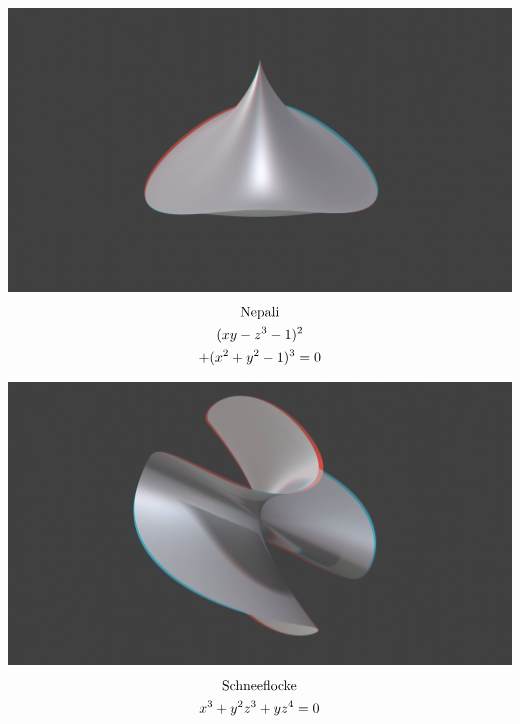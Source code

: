 \documentclass[paperwidth=46in, paperheight = 33.11in]{baposter}%
\begin{document}
\begin{poster}
{    \begin{center}
\begin{minipage}[t]{0.48\linewidth}
    \begin{center}
        \includegraphics[width=1.02\linewidth, scale = 0.5]{pictures/nepali}
        \begin{gather*}
               \textnormal{Nepali}\\
        (xy-z^3-1)^2\\+(x^2+y^2-1)^3=0
        \\
        \end{gather*}
    \end{center}
\end{minipage}
\hspace{0.01\linewidth}
\begin{minipage}[t]{0.48\linewidth}
    \begin{center}
        \includegraphics[width=1.02\linewidth, scale = 0.5]{pictures/schneeflocke}
        \begin{gather*}
           \textnormal{Schneeflocke}\\
        x^3+y^2z^3+yz^4=0
        \end{gather*}
    \end{center}
\end{minipage}
    \end{center}
}%


\end{poster}
\end{document}
